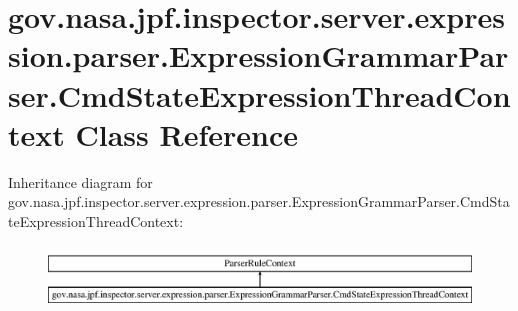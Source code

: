 \hypertarget{classgov_1_1nasa_1_1jpf_1_1inspector_1_1server_1_1expression_1_1parser_1_1_expression_grammar_paf34f6c6cf6d3cef851c12971caa03ed5}{}\section{gov.\+nasa.\+jpf.\+inspector.\+server.\+expression.\+parser.\+Expression\+Grammar\+Parser.\+Cmd\+State\+Expression\+Thread\+Context Class Reference}
\label{classgov_1_1nasa_1_1jpf_1_1inspector_1_1server_1_1expression_1_1parser_1_1_expression_grammar_paf34f6c6cf6d3cef851c12971caa03ed5}
Inheritance diagram for gov.\+nasa.\+jpf.\+inspector.\+server.\+expression.\+parser.\+Expression\+Grammar\+Parser.\+Cmd\+State\+Expression\+Thread\+Context\+:\begin{figure}[H]
\begin{center}
\leavevmode
\includegraphics[height=1.725732cm]{classgov_1_1nasa_1_1jpf_1_1inspector_1_1server_1_1expression_1_1parser_1_1_expression_grammar_paf34f6c6cf6d3cef851c12971caa03ed5}
\end{center}
\end{figure}
